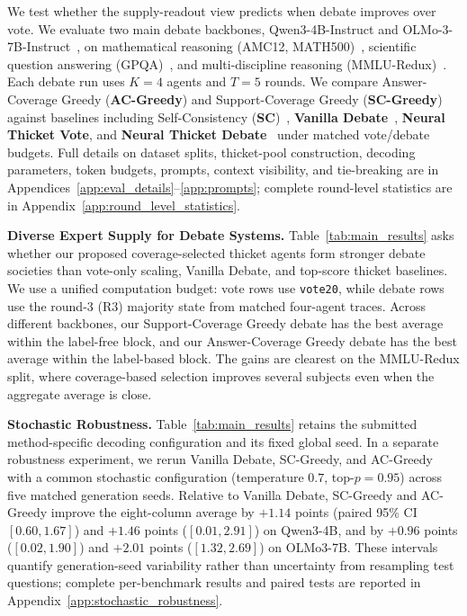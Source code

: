 \documentclass{article}
\newcommand{\acgreedy}{Answer-Coverage Greedy}
\newcommand{\scgreedy}{Support-Coverage Greedy}
\newcommand{\tabref}[1]{Table~\ref{#1}}
\newcommand{\appref}[1]{Appendix~\ref{#1}}
\begin{document}
We test whether the supply-readout view predicts when debate improves over
vote. We evaluate two main debate backbones, Qwen3-4B-Instruct and
OLMo-3-7B-Instruct~\citep{yang2025qwen3technicalreport, olmo2026olmo3}, on mathematical reasoning (AMC12, MATH500)~\citep{hendrycks2021measuringmathematicalproblemsolving}, scientific
question answering (GPQA)~\citep{rein2024gpqa}, and multi-discipline reasoning (MMLU-Redux)~\citep{hendrycks2021measuring, gema-etal-2025-done}. Each
debate run uses $K=4$ agents and $T=5$ rounds. We compare \acgreedy{} (\textbf{AC-Greedy}) and
\scgreedy{} (\textbf{SC-Greedy}) against baselines including Self-Consistency (\textbf{SC})~\citep{wang2023selfconsistency}, \textbf{Vanilla Debate}~\citep{du2024improving}, \textbf{Neural Thicket Vote}, and
\textbf{Neural Thicket Debate}~\citep{gan2026neuralthicketsdiversetask}
under matched vote/debate budgets. Full details on
dataset splits, thicket-pool construction, decoding parameters, token budgets,
prompts, context visibility, and tie-breaking are in
Appendices~\ref{app:eval_details}--\ref{app:prompts}; complete round-level
statistics are in \appref{app:round_level_statistics}.

\textbf{Diverse Expert Supply for Debate Systems.}
\tabref{tab:main_results} asks whether our proposed coverage-selected thicket agents form
stronger debate societies than vote-only scaling, Vanilla Debate, and top-score
thicket baselines. We use a unified computation budget: vote rows use
\texttt{vote20}, while debate rows use the round-3 (R3) majority state from matched
four-agent traces. Across different backbones, our \scgreedy{} debate has the
best average within the label-free block, and our \acgreedy{} debate has the best
average within the label-based block. The gains are clearest on the
MMLU-Redux split, where coverage-based selection improves several subjects even
when the aggregate average is close.

\textbf{Stochastic Robustness.}
Table~\ref{tab:main_results} retains the submitted method-specific decoding
configuration and its fixed global seed. In a separate robustness experiment,
we rerun Vanilla Debate, SC-Greedy, and AC-Greedy with a common stochastic
configuration (temperature $0.7$, top-$p=0.95$) across five matched generation
seeds. Relative to Vanilla Debate, SC-Greedy and AC-Greedy improve the
eight-column average by $+1.14$ points (paired 95\% CI $[0.60,1.67]$) and
$+1.46$ points ($[0.01,2.91]$) on Qwen3-4B, and by $+0.96$ points
($[0.02,1.90]$) and $+2.01$ points ($[1.32,2.69]$) on OLMo3-7B. These
intervals quantify generation-seed variability rather than uncertainty from
resampling test questions; complete per-benchmark results and paired tests are
reported in Appendix~\ref{app:stochastic_robustness}.
\end{document}

